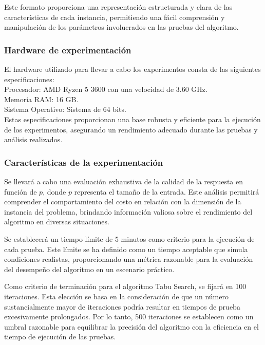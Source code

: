 \documentclass[letter, 10pt]{article}
\begin{document}
Este formato proporciona una representaci\'on estructurada y clara de las caracter\'isticas de cada instancia, permitiendo una f\'acil comprensi\'on y manipulaci\'on de los par\'ametros involucrados en las pruebas del algoritmo.

\subsubsection{Hardware de experimentaci\'on}

El hardware utilizado para llevar a cabo los experimentos consta de las siguientes especificaciones: \\
Procesador: AMD Ryzen 5 3600 con una velocidad de 3.60 GHz. \\
Memoria RAM: 16 GB. \\
Sistema Operativo: Sistema de 64 bits. \\
Estas especificaciones proporcionan una base robusta y eficiente para la ejecuci\'on de los experimentos, asegurando un rendimiento adecuado durante las pruebas y an\'alisis realizados.

\subsubsection{Caracter\'isticas de la experimentaci\'on}
Se llevar\'a a cabo una evaluaci\'on exhaustiva de la calidad de la respuesta en funci\'on de \( p \), donde \( p \) representa el tama\~{n}o de la entrada. Este an\'alisis permitir\'a comprender el comportamiento del costo en relaci\'on con la dimensi\'on de la instancia del problema, brindando informaci\'on valiosa sobre el rendimiento del algoritmo en diversas situaciones.

Se establecer\'a un tiempo l\'imite de 5 minutos como criterio para la ejecuci\'on de cada prueba. Este l\'imite se ha definido como un tiempo aceptable que simula condiciones realistas, proporcionando una m\'etrica razonable para la evaluaci\'on del desempe\~{n}o del algoritmo en un escenario pr\'actico.

Como criterio de terminaci\'on para el algoritmo Tabu Search, se fijar\'a en 100 iteraciones. Esta elecci\'on se basa en la consideraci\'on de que un n\'umero sustancialmente mayor de iteraciones podr\'ia resultar en tiempos de prueba excesivamente prolongados. Por lo tanto, 500 iteraciones se establecen como un umbral razonable para equilibrar la precisi\'on del algoritmo con la eficiencia en el tiempo de ejecuci\'on de las pruebas.
\end{document}
